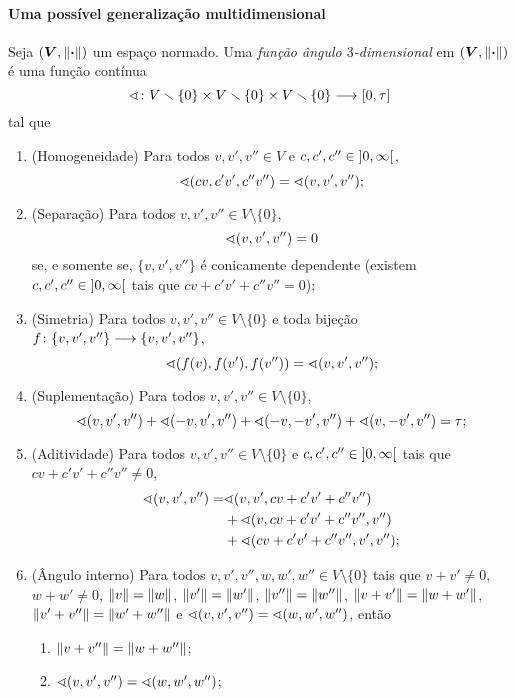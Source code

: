 \paragraph{Uma possível generalização multidimensional}


\begin{definition}
Seja $(\bm V, \left\Vert{\bm{\cdot}}\right\Vert)$ um espaço normado. Uma \emph{função ângulo $3$-dimensional} em $(\bm V, \left\Vert{\bm{\cdot}}\right\Vert)$ é uma função contínua
	\begin{equation*}
	\sphericalangle\colon \allowbreak V \smallsetminus \{0\} \times V \smallsetminus \{0\} \times V \smallsetminus \{0\} \longrightarrow \left[0,\allowbreak \tau\right]
	\end{equation*}
tal que
	\begin{enumerate}
		\item (Homogeneidade) Para todos $v,v',v'' \in V$ e $c,c',c'' \in \left]0,\allowbreak \infty\right[$,
			\begin{equation*}
				\sphericalangle(cv,c'v',c''v'') = \sphericalangle(v,v',v'');
			\end{equation*}
		\item (Separação) Para todos $v,v',v'' \in V \setminus \{0\}$,
			\begin{equation*}
				\sphericalangle(v,v',v'') = 0
			\end{equation*}
		se, e somente se, $\{v,v',v''\}$ é conicamente dependente (existem $c,c',c'' \in \left]0,\allowbreak \infty\right[$ tais que $cv+c'v'+c''v''=0$);
		\item (Simetria) Para todos $v,v',v'' \in V \setminus \{0\}$ e toda bijeção $f\colon \allowbreak \{v,v',v''\} \longrightarrow \{v,v',v''\}$,
			\begin{equation*}
				\sphericalangle(f(v),f(v'),f(v'')) = \sphericalangle(v,v',v'');
			\end{equation*}
		\item (Suplementação) Para todos $v,v',v'' \in V \setminus \{0\}$,
			\begin{equation*}
				\sphericalangle(v,v',v'') + \sphericalangle(-v,v',v'') + \sphericalangle(-v,-v',v'') + \sphericalangle(v,-v',v'') = \tau;
			\end{equation*}
		\item (Aditividade) Para todos $v,v',v'' \in V \setminus \{0\}$ e $c,c',c'' \in \left]0,\allowbreak \infty\right[$ tais que $cv+c'v'+c''v'' \neq 0$,
			\begin{align*}
				\sphericalangle(v,v',v'') =& \sphericalangle(v,v',cv+c'v'+c''v'') \\
					&+ \sphericalangle(v,cv+c'v'+c''v'',v'') \\
					&+ \sphericalangle(cv+c'v'+c''v'',v',v'');
			\end{align*}
		\item (Ângulo interno) Para todos $v,v',v'',w,w',w'' \in V \setminus \{0\}$ tais que $v+v' \neq 0$, $w+w' \neq 0$, $\left\Vert{v}\right\Vert=\left\Vert{w}\right\Vert$, $\left\Vert{v'}\right\Vert=\left\Vert{w'}\right\Vert$, $\left\Vert{v''}\right\Vert=\left\Vert{w''}\right\Vert$, $\left\Vert{v+v'}\right\Vert=\left\Vert{w+w'}\right\Vert$, $\left\Vert{v'+v''}\right\Vert=\left\Vert{w'+w''}\right\Vert$ e $\sphericalangle(v,v',v'')=\sphericalangle(w,w',w'')$, então
			\begin{enumerate}
				\item $\left\Vert{v+v''}\right\Vert=\left\Vert{w+w''}\right\Vert$;
				\item $\sphericalangle(v,v',v'')=\sphericalangle(w,w',w'')$;
			\end{enumerate}
	\end{enumerate}
\end{definition}
